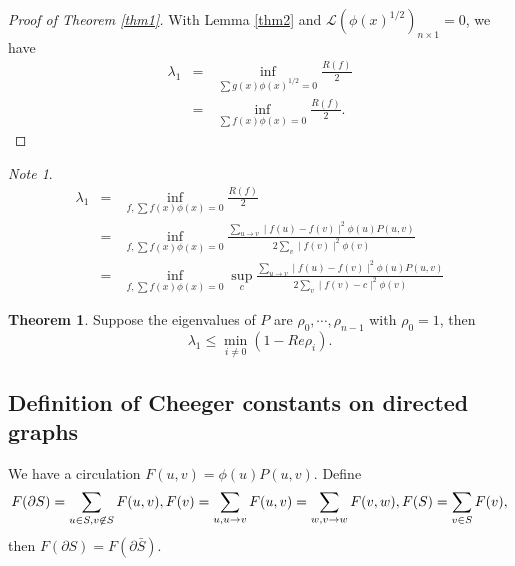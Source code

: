 \documentclass[twoside]{article}
\theoremstyle{definition}
\newtheorem{thm}{Theorem}[section]
\theoremstyle{definition}
\theoremstyle{remark}
\newtheorem*{note}{Note}
\def\L{{\mathcal L}}
\begin{document}
  \begin{proof}[Proof of Theorem \ref{thm1}]
  With Lemma \ref{thm2} and $\L(\phi(x)^{1/2})_{n\times 1}=0$, we have
  \begin{eqnarray*}
   \lambda_1 &=& \inf_{\sum g(x)\phi(x)^{1/2}=0} \frac{R(f)}{2}\\
			 &=& \inf_{\sum f(x)\phi(x)=0} \frac{R(f)}{2}.
  \end{eqnarray*}
  \end{proof}

  \begin{note}
  \begin{eqnarray*}
    \lambda_1 &=& \inf_{f,\sum f(x)\phi(x)=0} \frac{R(f)}{2} \\
              &=& \inf_{f,\sum f(x)\phi(x)=0} \frac{\sum_{u\rightarrow v} \mid f(u)-f(v) \mid^2 \phi(u)P(u,v)} {2\sum_{v} \mid f(v)\mid^2 \phi(v)} \\
              &=& \inf_{f,\sum f(x)\phi(x)=0}\sup_{c}
\frac{\sum_{u\rightarrow v} \mid f(u)-f(v) \mid^2 \phi(u)P(u,v)} {2\sum_{v} \mid f(v)-c \mid^2 \phi(v)}
  \end{eqnarray*}
  \end{note}

  \begin{thm}
  Suppose the eigenvalues of $P$ are $\rho_0,\cdots,\rho_{n-1}$ with $\rho_0=1$, then
  \[\lambda_1\leq \min_{i\neq 0}(1-Re\rho_i).\]
  \end{thm}

\subsection{Definition of Cheeger constants on directed graphs}
  We have a circulation $F(u,v)=\phi(u)P(u,v)$. Define
  \[F(\partial S)=\sum_{u\in S, v\not\in S} F(u,v), \\
    F(v)=\sum_{u,u\rightarrow v} F(u,v)=\sum_{w,v\rightarrow w} F(v,w),\\
    F(S)=\sum_{v\in S} F(v),\]
  then $F(\partial S)=F(\partial \bar{S}).$
\end{document}
